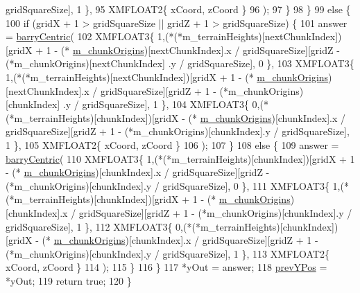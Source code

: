 \begin{DoxyCode}
       gridSquareSize], 1 \},
95                 XMFLOAT2\{ xCoord, zCoord \}
96             );
97         \}
98     \}
99     \textcolor{keywordflow}{else} \{
100         \textcolor{keywordflow}{if} (gridX + 1 > gridSquareSize || gridZ + 1 > gridSquareSize) \{
101             answer = \mbox{\hyperlink{class_terrain_collision_helper_aacd402e6c1598bda975a51883bbd409a}{barryCentric}}(
102                 XMFLOAT3\{ 1,(*(*m\_terrainHeights)[nextChunkIndex])[gridX + 1 - (*
      \mbox{\hyperlink{class_terrain_collision_helper_a49449b3d4ccf601ddca4200b5aa39b85}{m\_chunkOrigins}})[nextChunkIndex].x / gridSquareSize][gridZ - (*m\_chunkOrigins)[nextChunkIndex]
      .y / gridSquareSize], 0 \},
103                 XMFLOAT3\{ 1,(*(*m\_terrainHeights)[nextChunkIndex])[gridX + 1 - (*
      \mbox{\hyperlink{class_terrain_collision_helper_a49449b3d4ccf601ddca4200b5aa39b85}{m\_chunkOrigins}})[nextChunkIndex].x / gridSquareSize][gridZ + 1 - (*m\_chunkOrigins)[chunkIndex]
      .y / gridSquareSize], 1 \},
104                 XMFLOAT3\{ 0,(*(*m\_terrainHeights)[chunkIndex])[gridX - (*
      \mbox{\hyperlink{class_terrain_collision_helper_a49449b3d4ccf601ddca4200b5aa39b85}{m\_chunkOrigins}})[chunkIndex].x / gridSquareSize][gridZ + 1 - (*m\_chunkOrigins)[chunkIndex].y /
       gridSquareSize], 1 \},
105                 XMFLOAT2\{ xCoord, zCoord \}
106             );
107         \}
108         \textcolor{keywordflow}{else} \{
109             answer = \mbox{\hyperlink{class_terrain_collision_helper_aacd402e6c1598bda975a51883bbd409a}{barryCentric}}(
110                 XMFLOAT3\{ 1,(*(*m\_terrainHeights)[chunkIndex])[gridX + 1 - (*
      \mbox{\hyperlink{class_terrain_collision_helper_a49449b3d4ccf601ddca4200b5aa39b85}{m\_chunkOrigins}})[chunkIndex].x / gridSquareSize][gridZ - (*m\_chunkOrigins)[chunkIndex].y / 
      gridSquareSize], 0 \},
111                 XMFLOAT3\{ 1,(*(*m\_terrainHeights)[chunkIndex])[gridX + 1 - (*
      \mbox{\hyperlink{class_terrain_collision_helper_a49449b3d4ccf601ddca4200b5aa39b85}{m\_chunkOrigins}})[chunkIndex].x / gridSquareSize][gridZ + 1 - (*m\_chunkOrigins)[chunkIndex].y /
       gridSquareSize], 1 \},
112                 XMFLOAT3\{ 0,(*(*m\_terrainHeights)[chunkIndex])[gridX - (*
      \mbox{\hyperlink{class_terrain_collision_helper_a49449b3d4ccf601ddca4200b5aa39b85}{m\_chunkOrigins}})[chunkIndex].x / gridSquareSize][gridZ + 1 - (*m\_chunkOrigins)[chunkIndex].y /
       gridSquareSize], 1 \},
113                 XMFLOAT2\{ xCoord, zCoord \}
114             );
115         \}
116     \}
117     *yOut = answer;
118     \mbox{\hyperlink{class_terrain_collision_helper_a3418ac5abfc56f291e2ca54a8661513a}{prevYPos}} = *yOut;
119     \textcolor{keywordflow}{return} \textcolor{keyword}{true};
120 \}
\end{DoxyCode}
\mbox{\label{class_terrain_collision_helper_a20aabd831788e8953b580ebf263b156c}} 
